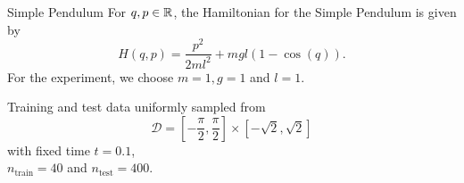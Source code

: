 \begin{frame}[c]{Simple Pendulum}
   {
  For $q,p \in \mathbb{R}$, the Hamiltonian for the Simple Pendulum is given by
  \begin{equation*}
    H(q,p) = \frac{p^2}{2ml^2} + mgl (1-\cos(q))
    .
  \end{equation*}
  For the experiment, we choose $m=1, g=1$ and $l=1$.
  }

   {
  \vspace{0.6cm}
  Training and test data uniformly sampled from
  \begin{equation*}
    \mathcal{D} = [-\frac{\pi}{2}, \frac{\pi}{2}] \times [-\sqrt{2}, \sqrt{2}]
  \end{equation*}
  with fixed time $t = 0.1$,\\
  $n_{\text{train}} = 40$ and $n_{\text{test}} = 400$.
  }
\end{frame}

